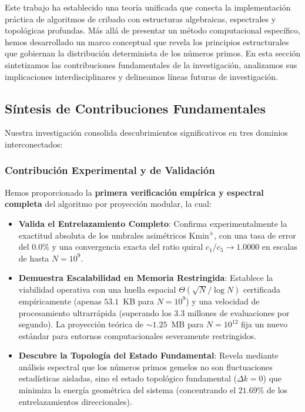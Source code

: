 \documentclass{article}
\numberwithin{equation}{section}
\theoremstyle{plain}
\theoremstyle{definition}
\begin{document}
Este trabajo ha establecido una teoría unificada que conecta la implementación práctica de algoritmos de cribado con estructuras algebraicas, espectrales y topológicas profundas. Más allá de presentar un método computacional específico, hemos desarrollado un marco conceptual que revela los principios estructurales que gobiernan la distribución determinista de los números primos. En esta sección sintetizamos las contribuciones fundamentales de la investigación, analizamos sus implicaciones interdisciplinares y delineamos líneas futuras de investigación.

\subsection{Síntesis de Contribuciones Fundamentales}

Nuestra investigación consolida descubrimientos significativos en tres dominios interconectados:

\subsubsection{Contribución Experimental y de Validación}

Hemos proporcionado la \textbf{primera verificación empírica y espectral completa} del algoritmo por proyección modular, la cual:

\begin{itemize}
    \item \textbf{Valida el Entrelazamiento Completo}: Confirma experimentalmente la exactitud absoluta de los umbrales asimétricos $\mathrm{Kmin}^\pm$, con una tasa de error del $0.0\%$ y una convergencia exacta del ratio quiral $c_1/c_5 \to 1.0000$ en escalas de hasta $N=10^9$.
    \item \textbf{Demuestra Escalabilidad en Memoria Restringida}: Establece la viabilidad operativa con una huella espacial $\Theta(\sqrt{N}/\log N)$ certificada empíricamente (apenas $53.1$~KB para $N=10^9$) y una velocidad de procesamiento ultrarrápida (superando los $3.3$ millones de evaluaciones por segundo). La proyección teórica de $\sim 1.25$~MB para $N=10^{12}$ fija un nuevo estándar para entornos computacionales severamente restringidos.
    \item \textbf{Descubre la Topología del Estado Fundamental}: Revela mediante análisis espectral que los números primos gemelos no son fluctuaciones estadísticas aisladas, sino el estado topológico fundamental ($\Delta k = 0$) que minimiza la energía geométrica del sistema (concentrando el $21.69\%$ de los entrelazamientos direccionales).
\end{itemize}
\end{document}
